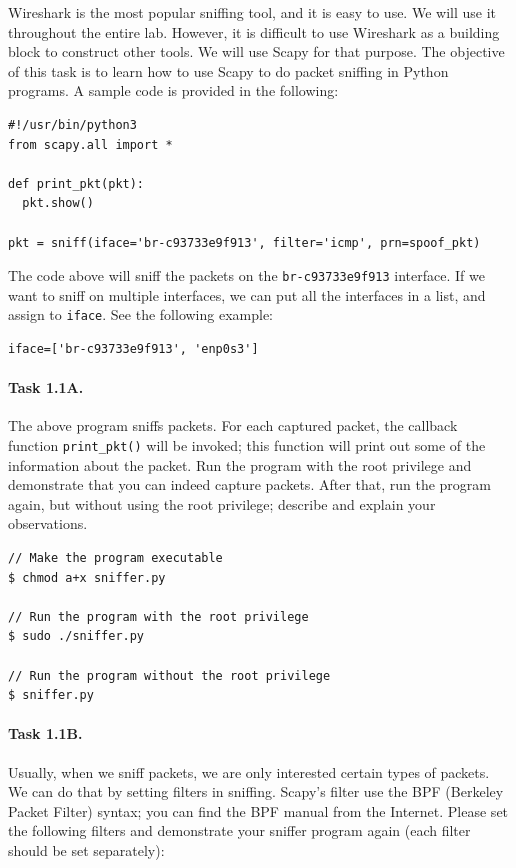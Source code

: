 Wireshark is the most popular sniffing tool, and it is easy to use. We will use it throughout 
the entire lab. However, it is difficult to use Wireshark as a building block 
to construct other tools. We will use Scapy for that purpose. The objective of this task is to
learn how to use Scapy to do packet sniffing in Python programs. 
A sample code is provided in the following:


\begin{lstlisting}
#!/usr/bin/python3
from scapy.all import *

def print_pkt(pkt):
  pkt.show()

pkt = sniff(iface='br-c93733e9f913', filter='icmp', prn=spoof_pkt)
\end{lstlisting}


The code above will sniff the packets on the \texttt{br-c93733e9f913}
interface. If we want to sniff on multiple interfaces, we can
put all the interfaces in a list, and assign to \texttt{iface}.
See the following example: 


\begin{lstlisting}
iface=['br-c93733e9f913', 'enp0s3']
\end{lstlisting}
 



\paragraph{Task 1.1A.} The above program sniffs packets. For each captured
packet, the callback function \texttt{print\_pkt()} will be invoked; this function will print out some of
the information about the packet. Run the program with the root privilege and demonstrate that
you can indeed capture packets. After that, run the program again, but without using the root
privilege; describe and explain your observations. 
 
\begin{lstlisting}
// Make the program executable 
$ chmod a+x sniffer.py

// Run the program with the root privilege
$ sudo ./sniffer.py

// Run the program without the root privilege
$ sniffer.py
\end{lstlisting}


\paragraph{Task 1.1B.} Usually, when we sniff packets, we are only
interested certain types of packets. We can do that by setting 
filters in sniffing. Scapy's filter use the 
BPF (Berkeley Packet Filter) syntax; you can find the BPF manual 
from the Internet. Please set the following filters and demonstrate 
your sniffer program again (each filter should be set separately):

